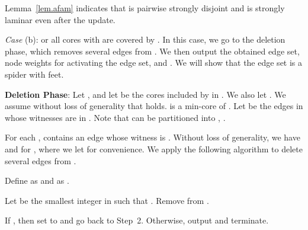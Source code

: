 \documentclass[11pt]{article}
\begin{document}
Lemma~\ref{lem.afam} indicates that
 is pairwise strongly disjoint and  is strongly laminar
even after the update. 


{\em Case} (b):  or 
all cores  with  are covered by .
In this case, we go to the deletion phase, which
removes several edges from .
We then output the obtained edge set, 
node weights for activating the edge set,
and .
We will show that the edge set is a spider with  feet.


{\bf Deletion Phase}\/:
Let , and let
 be the cores included by 
in .
We also let .
We assume without loss of generality that  holds.
 is a min-core of .
Let  be the edges in  whose witnesses are in 
.
Note that  can be partitioned into
, .

For each ,
 contains an edge
 whose witness is .
Without loss of generality, we have  and  for ,
where we let  for convenience.
We apply the following algorithm to delete several edges from .

\begin{description}\setlength{\itemsep}{0pt}
 \item[Deletion algorithm]
 \item[Step 1:]
	    Define  as  and  as .
 \item[Step 2:]
	    Let  be the smallest integer in  such that 
	    .
	    Remove 
	    from .
 \item[Step 3:] If , then set  to  and go back to Step~2.
	    Otherwise, output  and terminate.
\end{description}
\end{document}
